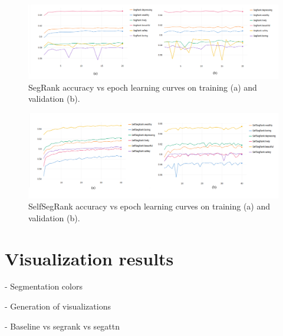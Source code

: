 \begin{figure}[ht]
	\begin{center}
	\includegraphics[width=1\textwidth]{./figures/segrank_graph.png}
	\caption[SegRank Training curves]{
        SegRank accuracy vs epoch learning curves on training (a) and validation (b).
        }
	\label{fig:segrank_graph}
	\end{center}
\end{figure}

\begin{figure}[ht]
	\begin{center}
	\includegraphics[width=1\textwidth]{./figures/selfsegrank_graph.png}
	\caption[SelfSegRank Training curves]{
        SelfSegRank accuracy vs epoch learning curves on training (a) and validation (b).
        }
	\label{fig:selfsegrank_graph}
	\end{center}
\end{figure}


\section{Visualization results}

- Segmentation colors

- Generation of visualizations

- Baseline vs segrank vs segattn